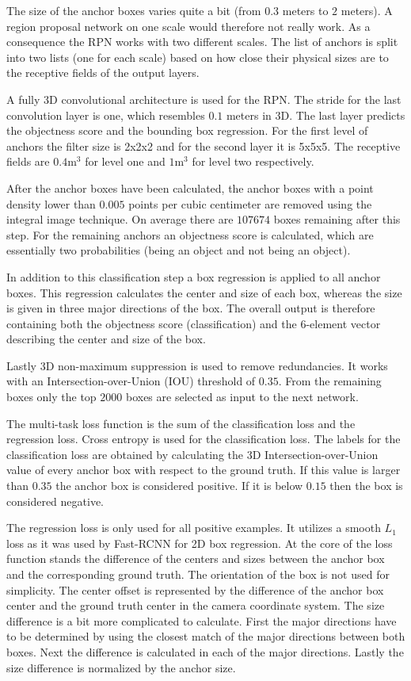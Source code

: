 \documentclass[12pt]{scrartcl}
\begin{document}
The size of the anchor boxes varies quite a bit (from \(0.3\) meters to \(2\)
meters). A region proposal network on one scale would therefore not really work.
As a consequence the RPN works with two different scales. The list of anchors
is split into two lists (one for each scale) based on how close their physical
sizes are to the receptive fields of the output layers.

A fully 3D convolutional architecture is used for the RPN. The stride for the last
convolution layer is one, which resembles \(0.1\) meters in 3D. The last layer
predicts the objectness score and the bounding box regression. For the first level
of anchors the filter size is 2x2x2 and for the second layer it is 5x5x5. The
receptive fields are \(0.4 \text{m}^3\) for level one and \(1 \text{m}^3\) for
level two respectively.

After the anchor boxes have been calculated, the anchor boxes with a point density
lower than \(0.005\) points per cubic centimeter are removed using the integral
image technique. On average there are \(107674\) boxes remaining after this step.
For the remaining anchors an objectness score is calculated, which are essentially
two probabilities (being an object and not being an object).

In addition to this classification step a box regression is applied to all
anchor boxes. This regression calculates the center and size of each
box, whereas the size is given in three major directions of the box.
The overall output is therefore containing both the objectness score (classification)
and the 6-element vector describing the center and size of the box.

Lastly 3D non-maximum suppression is used to remove redundancies. It works with
an Intersection-over-Union (IOU) threshold of \(0.35\). From the remaining
boxes only the top \(2000\) boxes are selected as input to the next network.

The multi-task loss function is the sum of the classification loss and the
regression loss. Cross entropy is used for the classification loss.
The labels for the classification loss are obtained by calculating the 3D
Intersection-over-Union value of every anchor box with respect to the ground truth.
If this value is larger than \(0.35\) the anchor box is considered positive. If
it is below \(0.15\) then the box is considered negative.

The regression loss is only used for all positive examples. It utilizes a smooth
\(L_1\) loss as it was used by Fast-RCNN\cite{Girshick2015} for 2D box regression.
At the core of the loss function stands the difference of the centers and sizes
between the anchor box and the corresponding ground truth. The orientation of
the box is not used for simplicity. The center offset is represented
by the difference of the anchor box center and the ground truth center in the
camera coordinate system. The size difference is a bit more complicated to calculate.
First the major directions have to be determined by using the closest match of
the major directions between both boxes. Next the difference is calculated in
each of the major directions. Lastly the size difference is normalized by the
anchor size.
\end{document}
